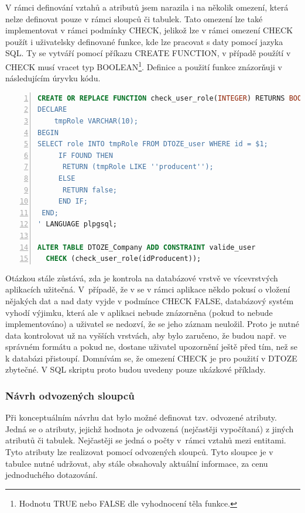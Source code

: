 \documentclass[11pt,a4paper]{article}
\begin{document}
V rámci definování vztahů a atributů jsem narazila i na několik omezení, která nelze definovat pouze v rámci sloupců či tabulek. Tato omezení lze také implementovat v rámci podmínky CHECK, jelikož lze v rámci omezení CHECK použít i uživatelsky definované funkce, kde lze pracovat s daty pomocí jazyka SQL. Ty se vytváří pomocí příkazu CREATE FUNCTION, v případě použítí v CHECK musí vracet typ BOOLEAN\footnote{Hodnotu TRUE nebo FALSE dle vyhodnocení těla funkce.}. Definice a použití funkce znázorňuji v následujícím úryvku kódu.

\newpage
\vspace{0.5cm}
\begin{lstlisting}[language=SQL, label=DescriptiveLabel, backgroundcolor=\color{grey}, numbers=left, basicstyle=\footnotesize, breaklines=true, breakatwhitespace=true, showspaces=false, showstringspaces=false]
CREATE OR REPLACE FUNCTION check_user_role(INTEGER) RETURNS BOOLEAN AS '
DECLARE
    tmpRole VARCHAR(10);
BEGIN
SELECT role INTO tmpRole FROM DTOZE_user WHERE id = $1;      
     IF FOUND THEN
      RETURN (tmpRole LIKE ''producent'');
     ELSE 
      RETURN false;
     END IF;
 END;
' LANGUAGE plpgsql;

ALTER TABLE DTOZE_Company ADD CONSTRAINT valide_user 
  CHECK (check_user_role(idProducent));
\end{lstlisting}
\vspace{0.5cm}

Otázkou stále zůstává, zda je kontrola na databázové vrstvě ve vícevrstvých aplikacích užitečná. V~případě, že v se v rámci aplikace někdo pokusí o vložení nějakých dat a nad daty vyjde v podmínce CHECK FALSE, databázový systém vyhodí výjimku, která ale v aplikaci nebude znázorněna (pokud to nebude implementováno) a uživatel se nedozví, že se jeho záznam neuložil. Proto je nutné data kontrolovat už na vyšších vrstvách, aby bylo zaručeno, že budou např. ve správném formátu a pokud ne, dostane uživatel upozornění ještě před tím, než se k databázi přistoupí. Domnívám se, že omezení CHECK je pro použití v DTOZE zbytečné. V SQL skriptu proto budou uvedeny pouze ukázkové příklady. 

\subsubsection{Návrh odvozených sloupců} 
Při konceptuálním návrhu dat bylo možné definovat tzv. odvozené atributy. Jedná se o atributy, jejichž hodnota je odvozená (nejčastěji vypočítaná) z jiných atributů či tabulek. Nejčastěji se jedná o počty v~rámci vztahů mezi entitami. Tyto atributy lze realizovat pomocí odvozených sloupců. Tyto sloupce je v tabulce nutné udržovat, aby stále obsahovaly aktuální informace, za cenu jednoduchého dotazování.
\end{document}
